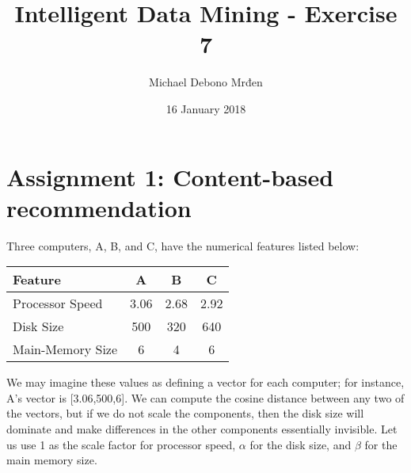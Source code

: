 \documentclass{article}
\title{Intelligent Data Mining - Exercise 7}
\author{\fontencoding{T1}\selectfont Michael Debono Mrđen}
\date{16 January 2018}
\begin{document}
\maketitle

\section{Assignment 1: Content-based recommendation}
\renewcommand{\labelenumi}{\alph{enumi}.}
\renewcommand{\labelenumii}{\arabic{enumii}.}

Three computers, A, B, and C, have the numerical features listed below:
	
	\begin{center}
		\begin{tabular}{ l | c | c | c }
			Feature          & A    & B    & C    \\ \hline
			Processor Speed  & 3.06 & 2.68 & 2.92 \\
			Disk Size        & 500  & 320  & 640  \\
			Main-Memory Size & 6    & 4    & 6
		\end{tabular}
	\end{center}

We may imagine these values as defining a vector for each computer; for instance, A's vector is
[3.06,500,6]. We can compute the cosine distance between any two of the vectors, but if we do not scale the components, then the disk size will dominate and make differences in the other components essentially invisible. Let us use 1 as the scale factor for processor speed, $\alpha$ for the disk size, and $\beta$ for the main memory size.
\end{document}

